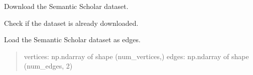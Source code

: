 \documentclass[letterpaper,10pt,english]{sphinxmanual}
\begin{document}
\begin{fulllineitems}
\begin{fulllineitems}
\begin{quote}
\begin{description}
\end{description}\end{quote}

\end{fulllineitems}


\begin{fulllineitems}
\label{\detokenize{api_reference:id64}}
\pysigstartsignatures
{}
\pysigstopsignatures
\sphinxAtStartPar
Download the Semantic Scholar dataset.

\end{fulllineitems}


\begin{fulllineitems}
\label{\detokenize{api_reference:id65}}
\pysigstartsignatures
{}
\pysigstopsignatures
\sphinxAtStartPar
Check if the dataset is already downloaded.

\end{fulllineitems}


\begin{fulllineitems}
\label{\detokenize{api_reference:id66}}
\pysigstartsignatures
{}
\pysigstopsignatures
\sphinxAtStartPar
Load the Semantic Scholar dataset as edges.
\begin{quote}\begin{description}
\sphinxAtStartPar
\begin{description}
\sphinxAtStartPar
vertices: np.ndarray of shape (num\_vertices,)
edges: np.ndarray of shape (num\_edges, 2)

\end{description}


\sphinxAtStartPar
{}

\end{description}\end{quote}

\end{fulllineitems}


\end{fulllineitems}
\end{document}
